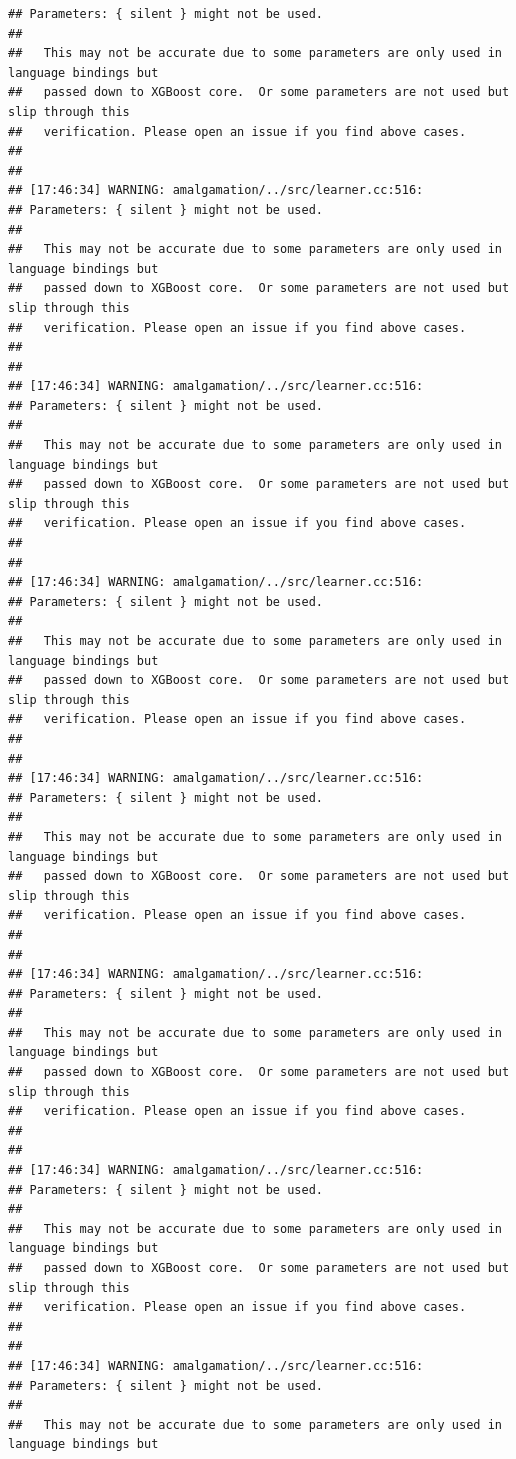 \documentclass[AMS,STIX2COL]{WileyNJD-v2}\usepackage[]{graphicx}\usepackage[]{color}
\makeatletter
\newenvironment{kframe}{%
 \def\at@end@of@kframe{}%
 \ifinner\ifhmode%
  \def\at@end@of@kframe{\end{minipage}}%
  \begin{minipage}{\columnwidth}%
 \fi\fi%
 \def\FrameCommand##1{\hskip\@totalleftmargin \hskip-\fboxsep
 \colorbox{shadecolor}{##1}\hskip-\fboxsep
     \hskip-\linewidth \hskip-\@totalleftmargin \hskip\columnwidth}%
 \MakeFramed {\advance\hsize-\width
   \@totalleftmargin\z@ \linewidth\hsize
   \@setminipage}}%
 {\par\unskip\endMakeFramed%
 \at@end@of@kframe}
\newenvironment{knitrout}{}{} %
\makeatother
\begin{document}
\begin{knitrout}
\begin{kframe}
\begin{verbatim}
## Parameters: { silent } might not be used.
## 
##   This may not be accurate due to some parameters are only used in language bindings but
##   passed down to XGBoost core.  Or some parameters are not used but slip through this
##   verification. Please open an issue if you find above cases.
## 
## 
## [17:46:34] WARNING: amalgamation/../src/learner.cc:516: 
## Parameters: { silent } might not be used.
## 
##   This may not be accurate due to some parameters are only used in language bindings but
##   passed down to XGBoost core.  Or some parameters are not used but slip through this
##   verification. Please open an issue if you find above cases.
## 
## 
## [17:46:34] WARNING: amalgamation/../src/learner.cc:516: 
## Parameters: { silent } might not be used.
## 
##   This may not be accurate due to some parameters are only used in language bindings but
##   passed down to XGBoost core.  Or some parameters are not used but slip through this
##   verification. Please open an issue if you find above cases.
## 
## 
## [17:46:34] WARNING: amalgamation/../src/learner.cc:516: 
## Parameters: { silent } might not be used.
## 
##   This may not be accurate due to some parameters are only used in language bindings but
##   passed down to XGBoost core.  Or some parameters are not used but slip through this
##   verification. Please open an issue if you find above cases.
## 
## 
## [17:46:34] WARNING: amalgamation/../src/learner.cc:516: 
## Parameters: { silent } might not be used.
## 
##   This may not be accurate due to some parameters are only used in language bindings but
##   passed down to XGBoost core.  Or some parameters are not used but slip through this
##   verification. Please open an issue if you find above cases.
## 
## 
## [17:46:34] WARNING: amalgamation/../src/learner.cc:516: 
## Parameters: { silent } might not be used.
## 
##   This may not be accurate due to some parameters are only used in language bindings but
##   passed down to XGBoost core.  Or some parameters are not used but slip through this
##   verification. Please open an issue if you find above cases.
## 
## 
## [17:46:34] WARNING: amalgamation/../src/learner.cc:516: 
## Parameters: { silent } might not be used.
## 
##   This may not be accurate due to some parameters are only used in language bindings but
##   passed down to XGBoost core.  Or some parameters are not used but slip through this
##   verification. Please open an issue if you find above cases.
## 
## 
## [17:46:34] WARNING: amalgamation/../src/learner.cc:516: 
## Parameters: { silent } might not be used.
## 
##   This may not be accurate due to some parameters are only used in language bindings but

\end{verbatim}
\end{kframe}
\end{knitrout}
\end{document}
